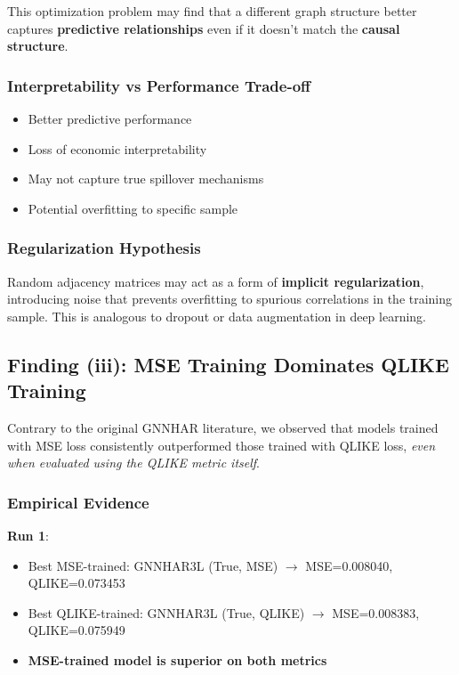 \documentclass[10pt,a4paper]{article}
\begin{document}
This optimization problem may find that a different graph structure better captures \textbf{predictive relationships} even if it doesn't match the \textbf{causal structure}.

\subsubsection{Interpretability vs Performance Trade-off}

\begin{itemize}
\item[\textcolor{green}{$\checkmark$}] Better predictive performance
\item[\textcolor{red}{$\times$}] Loss of economic interpretability
\item[\textcolor{red}{$\times$}] May not capture true spillover mechanisms
\item[\textcolor{red}{$\times$}] Potential overfitting to specific sample
\end{itemize}

\subsubsection{Regularization Hypothesis}

Random adjacency matrices may act as a form of \textbf{implicit regularization}, introducing noise that prevents overfitting to spurious correlations in the training sample. This is analogous to dropout or data augmentation in deep learning.

\subsection{Finding (iii): MSE Training Dominates QLIKE Training}

Contrary to the original GNNHAR literature, we observed that models trained with MSE loss consistently outperformed those trained with QLIKE loss, \textit{even when evaluated using the QLIKE metric itself}.

\subsubsection{Empirical Evidence}

\textbf{Run 1}:
\begin{itemize}
\item Best MSE-trained: GNNHAR3L (True, MSE) $\to$ MSE=0.008040, QLIKE=0.073453
\item Best QLIKE-trained: GNNHAR3L (True, QLIKE) $\to$ MSE=0.008383, QLIKE=0.075949
\item \textbf{MSE-trained model is superior on both metrics}
\end{itemize}
\end{document}
